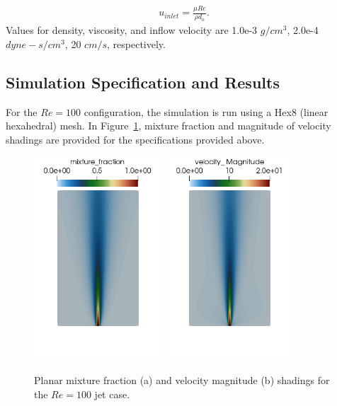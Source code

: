 \documentclass{article}
\begin{document}
\begin{align}
  u_{inlet} = \frac{\mu Re}{\rho d_o}.
\label{eq:muForm}
\end{align}
%
Values for density, viscosity, and inflow velocity are 1.0e-3 $g/cm^3$, 2.0e-4 $dyne-s/cm^3$, 
20 $cm/s$, respectively.
\subsection{Simulation Specification and Results}

For the $Re = 100$ configuration, the simulation is run using a Hex8 (linear hexahedral)
mesh. In Figure~\ref{fig:results}, mixture fraction and magnitude of velocity shadings 
are provided for the specifications provided above.

\begin{figure}[!htbp]
 \subfloat[]
  \centering
  {
   \includegraphics[height=3.0in]{images/3d_hex8_open_jet_mix_frac.png}
  }
  \subfloat[]
  \centering
  {
   \includegraphics[height=3.0in]{images/3d_hex8_open_jet_umag.png}
  }
  \caption{Planar mixture fraction (a) and velocity magnitude (b) shadings for the $Re = 100$ jet case.}
  \label{fig:results}
\end{figure}
\end{document}
